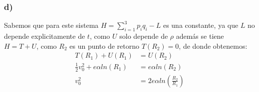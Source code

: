 \documentclass{article}
\begin{document}
\begin{tcolorbox}[breakable]
    \subsubsection*{d)}
    Sabemos que para este sistema $H=\sum_{i=1}^3 p_iq_i - L$ es una constante, ya que $L$ no depende explicitamente de $t$,
    como $U$ solo depende de $\rho$ además se tiene $H=T+U$, como $R_2$ es un punto de retorno $T(R_2)=0$, de donde obtenemos:
    \begin{align*}
        T(R_1) + U(R_1) &= U(R_2) \\
        \frac{1}{2}v_0^2 + e\alpha ln(R_1) &= e\alpha ln(R_2) \\
        v_0^2 &= 2e\alpha ln\left(\frac{R_2}{R_1}\right)
    \end{align*}

\end{tcolorbox}
\newpage
\end{document}
